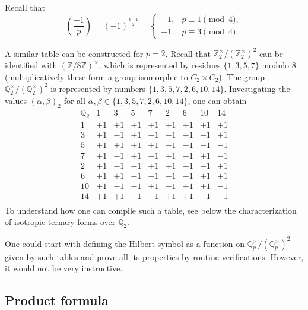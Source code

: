 \documentclass{article}
\newcommand{\legendre}[2]{\left(\frac{#1}{#2}\right)}
\newcommand{\ZZ}{\mathbb{Z}}
\newcommand{\QQ}{\mathbb{Q}}
\theoremstyle{myplain}
\theoremstyle{mydefinition}
\begin{document}
Recall that
\[ \legendre{-1}{p} = (-1)^{\frac{p-1}{2}} =
  \left\{\begin{array}{ll}
           +1, & p \equiv 1\pmod{4},\\
           -1, & p \equiv 3\pmod{4}.
         \end{array}\right. \]

\vspace{1em}

A similar table can be constructed for $p = 2$. Recall that
$\ZZ_2^\times / (\ZZ_2^\times)^2$ can be identified with $(\ZZ/8\ZZ)^\times$,
which is represented by residues
$\{ \overline{1}, \overline{3}, \overline{5}, \overline{7} \}$ modulo $8$
(multiplicatively these form a group isomorphic to $C_2\times C_2$). The group
$\QQ_2^\times / (\QQ_2^\times)^2$ is represented by numbers
$\{ 1, 3, 5, 7, 2, 6, 10, 14 \}$. Investigating the values $(\alpha,\beta)_2$
for all $\alpha,\beta \in \{ 1, 3, 5, 7, 2, 6, 10, 14 \}$, one can obtain
\[ \begin{array}{r|rrrrrrrr}
     \QQ_2  & 1 &  3 &  5 &  7 &  2 &  6 & 10 & 14 \\
     \hline
     1 &  +1 &  +1 &  +1 &  +1 &  +1 &  +1 &  +1 &  +1 \\
     3 &  +1 &  -1 &  +1 &  -1 &  -1 &  +1 &  -1 &  +1 \\
     5 &  +1 &  +1 &  +1 &  +1 &  -1 &  -1 &  -1 &  -1 \\
     7 &  +1 &  -1 &  +1 &  -1 &  +1 &  -1 &  +1 &  -1 \\
     2 &  +1 &  -1 &  -1 &  +1 &  +1 &  -1 &  -1 &  +1 \\
     6 &  +1 &  +1 &  -1 &  -1 &  -1 &  -1 &  +1 &  +1 \\
     10 &  +1 &  -1 &  -1 &  +1 &  -1 &  +1 &  +1 &  -1 \\
     14 &  +1 &  +1 &  -1 &  -1 &  +1 &  +1 &  -1 &  -1 \\
   \end{array} \]
To understand how one can compile such a table, see below the
characterization of isotropic ternary forms over $\QQ_2$.

\vspace{1em}

One could start with defining the Hilbert symbol as a function on
$\QQ_p^\times / (\QQ_p^\times)^2$ given by such tables and prove all its
properties by routine verifications. However, it would not be very instructive.

\subsection*{Product formula}
\end{document}
